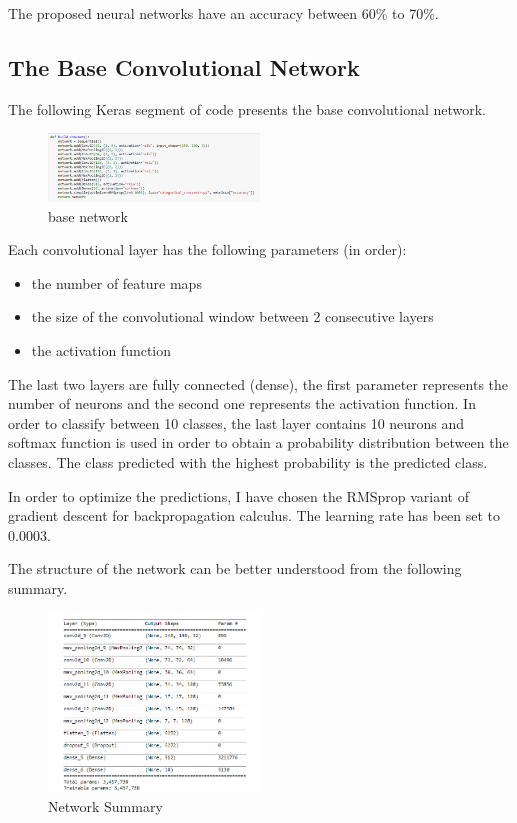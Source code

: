 \documentclass[a4paper,10pt]{article}
\begin{document}
  \quad The proposed neural networks have an accuracy between 60\% to 70\%.

  \subsection{The Base Convolutional Network}
\quad \quad The following Keras segment of code presents the base convolutional network.
 
 \begin{figure}[!htbp]
 	\centering
 	\includegraphics[width=0.5\textwidth]{base_network.png}
 	\caption{base network}
 \end{figure}
 \vspace{5mm} %
 
 
  \quad Each convolutional layer has the following parameters (in order):
  \begin{itemize}
  	\item the number of feature maps
  	\item the size of the convolutional window between 2 consecutive layers
  	\item the activation function 
  \end{itemize}
 
 \quad The last two layers are fully connected (dense), the first parameter represents the number of neurons and the second one represents the activation function. In order to classify between 10 classes, the last layer contains 10 neurons and softmax function is used in order to obtain a probability distribution between the classes. The class predicted with the highest probability is the predicted class. 
 
 \quad In order to optimize the predictions, I have chosen the RMSprop variant of gradient descent for backpropagation calculus. The learning rate has been set to 0.0003.
 \vspace{5mm} %
 
 \quad The structure of the network can be better understood from the following summary.
 
  \begin{figure}[!htbp]
 	\centering
 	\includegraphics[width=0.5\textwidth]{network_summary.png}
 	\caption{Network Summary}
 \end{figure}
 \vspace{5mm} %
 
\end{document}

